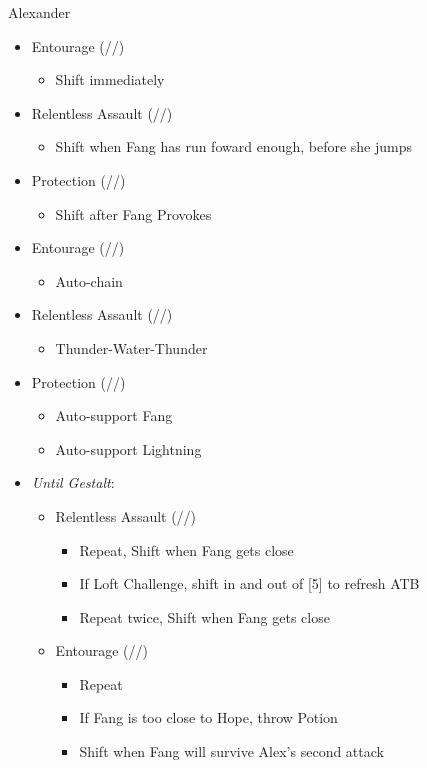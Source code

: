\documentclass{report}
\begin{document}
\renewcommand{\first}{[1] Entourage (\rav/\med/\sen)}
\renewcommand{\second}{[2] Protection (\syn/\med/\sen)}
\renewcommand{\third}{[3] }
\renewcommand{\fourth}{[4] }
\renewcommand{\fifth}{[5] }
\renewcommand{\sixth}{[6] Relentless Assault (\rav/\rav/\com)}
\begin{battle}{Alexander}
\begin{itemize}
    \item \first
    \begin{itemize}
        \item Shift immediately
    \end{itemize}
    \item \sixth
    \begin{itemize}
        \item Shift when Fang  has run foward enough, before she jumps
    \end{itemize}
    \item \second
    \begin{itemize}
        \item Shift after Fang Provokes
    \end{itemize}
    \item \first
    \begin{itemize}
        \item Auto-chain
    \end{itemize}
    \item \sixth
    \begin{itemize}
        \item Thunder-Water-Thunder
    \end{itemize}
    \item \second
    \begin{itemize}
        \item Auto-support Fang
        \item Auto-support Lightning
    \end{itemize}
    \item \textit{Until Gestalt}:
    \begin{itemize}
        \item \sixth
        \begin{itemize}
            \item Repeat, Shift when Fang gets close
            \item If Loft Challenge, shift in and out of [5] to refresh ATB
            \item Repeat twice, Shift when Fang gets close
        \end{itemize}
        \item \first
        \begin{itemize}
            \item Repeat
            \item If Fang is too close to Hope, throw Potion
            \item Shift when Fang will survive Alex's second attack
        \end{itemize}
    \end{itemize}
\end{itemize}
\end{battle}
\end{document}
